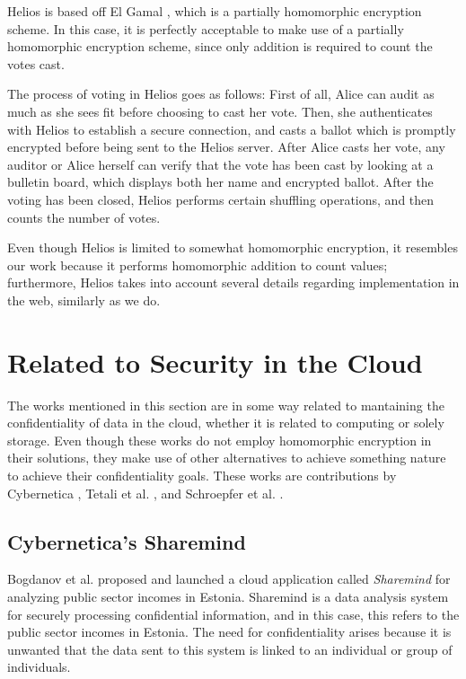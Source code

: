 Helios is based off El Gamal \cite{ElGamal:1985:PKC:19478.19480}, which is a partially homomorphic encryption scheme. In this case, it is perfectly acceptable to make use of a partially homomorphic encryption scheme, since only addition is required to count the votes cast. 

The process of voting in Helios goes as follows: First of all, Alice can audit as much as she sees fit before choosing to cast her vote.  Then, she authenticates with Helios to establish a secure connection, and casts a ballot which is promptly encrypted before being sent to the Helios server. After Alice casts her vote, any auditor or Alice herself can verify that the vote has been cast by looking at a bulletin board, which displays both her name and encrypted ballot. After the voting has been closed, Helios performs certain shuffling operations, and then counts the number of votes.

Even though Helios is limited to somewhat homomorphic encryption, it resembles our work because it performs homomorphic addition to count values; furthermore, Helios takes into account several details regarding implementation in the web, similarly as we do.

\section{{Related to Security in the Cloud}}
The works mentioned in this section are in some way related to mantaining the confidentiality of data in the cloud, whether it is related to computing or solely storage. Even though these works do not employ homomorphic encryption in their solutions, they make use of other alternatives to achieve something nature to achieve their confidentiality goals. These works are contributions by Cybernetica \cite{ESORICS08:BLW08}, Tetali et al. \cite{Tetali:2013:MSA:2544173.2509554}, and Schroepfer et al. \cite{Schroepfer:2011:DSC:2046707.2093509}.

\subsection{Cybernetica's Sharemind}
Bogdanov et al. \cite{ESORICS08:BLW08} proposed and launched a cloud application called \emph{Sharemind} for analyzing public sector incomes in Estonia. Sharemind is a data analysis system for securely processing confidential information, and in this case, this refers to the public sector incomes in Estonia. The need for confidentiality arises because it is unwanted that the data sent to this system is linked to an individual or group of individuals. 

